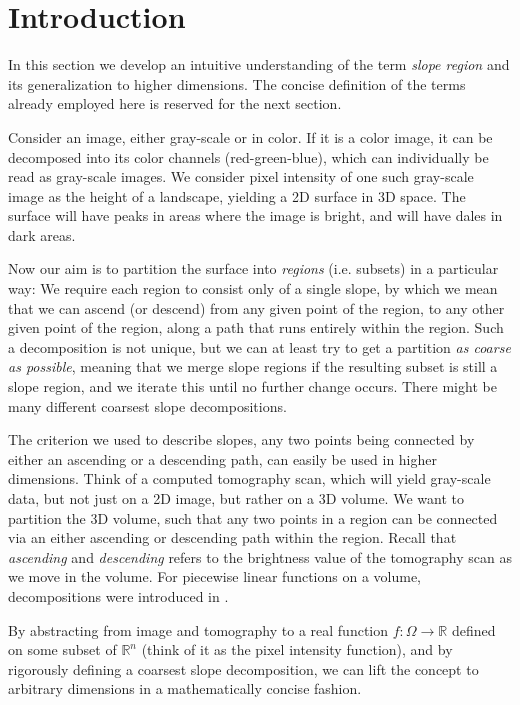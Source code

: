 \documentclass[11pt,twoside,twocolumn,a4paper]{article}
\theoremstyle{plain}
\theoremstyle{definition}
\begin{document}
\section{Introduction}
\label{sec:motivating_slope_regions}

In this section we develop an intuitive understanding of the term \emph{slope region} \cite{kropatsch2019computing} and its generalization to  higher dimensions.
The concise definition of the terms already employed here is reserved for the next section.

Consider an image, either gray-scale or in color.
If it is a color image, it can be decomposed into its color channels (red-green-blue), which can individually be read as gray-scale images.
We consider pixel intensity of one such gray-scale image as the height of a landscape, yielding a 2D surface in 3D space.
The surface will have peaks in areas where the image is bright, and will have dales in dark areas.

Now our aim is to partition the surface into \emph{regions} (i.e. subsets) in a particular way:
We require each region to consist only of a single slope, by which we mean that we can ascend (or descend) from any given point of the region, to any other given point of the region, along a path that runs entirely within the region.
Such a decomposition is not unique, but we can at least try to get a partition \emph{as coarse as possible}, meaning that we merge slope regions if the resulting subset is still a slope region, and we iterate this until no further change occurs.
There might be many different coarsest slope decompositions.

The criterion we used to describe slopes, any two points being connected by either an ascending or a descending path, can easily be used in higher dimensions.
Think of a computed tomography scan, which will yield gray-scale data, but not just on a 2D image, but rather on a 3D volume.
We want to partition the 3D volume, such that any two points in a region can be connected via an either ascending or descending path within the region.
Recall that \emph{ascending} and \emph{descending} refers to the brightness value of the tomography scan as we move in the volume. For piecewise linear functions on a volume, decompositions were introduced in \cite{edelsbrunner2003morse}. 

By abstracting from image and tomography to a real function $f: \Omega \rightarrow \mathbb{R}$ defined on some subset of $\mathbb{R}^n$ (think of it as the pixel intensity function), and by rigorously defining a coarsest slope decomposition, we can lift the concept to arbitrary dimensions in a mathematically concise fashion.
\end{document}

